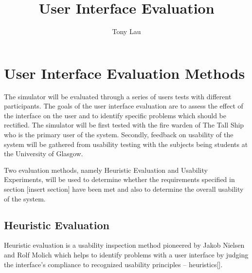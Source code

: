 \documentclass{article}
\begin{document}
\title{User Interface Evaluation}
\author{Tony Lau}
\maketitle
\section{User Interface Evaluation Methods}
\label{evalmethods}

The simulator will be evaluated through a series of users tests with different participants. The goals of the user interface evaluation are to assess the effect of the interface on the user and to identify specific problems which should be rectified. The simulator will be first tested with the fire warden of The Tall Ship who is the primary user of the system. Secondly, feedback on usability of the system will be gathered from usability testing with the subjects being students at the University of Glasgow.

Two evaluation methods, namely Heuristic Evaluation and Usability Experiments, will be used to determine whether the requirements specified in section [insert section] have been met and also to determine the overall usability of the system.

\subsection{Heuristic Evaluation}
Heuristic evaluation is a usability inspection method pioneered by Jakob Nielsen and Rolf Molich which helps to identify problems with a user interface by judging the interface’s compliance to recognized usability principles -- heuristics[].
\end{document}
